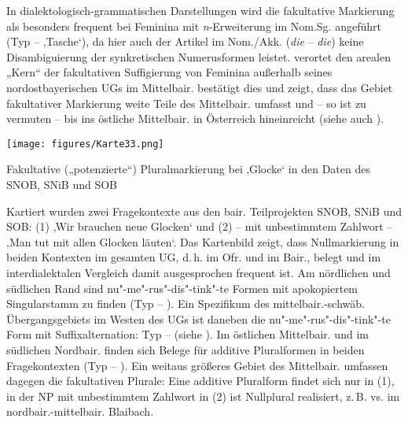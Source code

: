 In dialektologisch-grammatischen Darstellungen wird die fakultative Markierung als besonders frequent bei Feminina mit \textit{n}-Erweiterung im Nom.Sg. angeführt (Typ  --  ‚Tasche‘), da hier auch der Artikel im Nom./Akk. (\textit{die} -- \textit{die}) keine Dis\-am\-bi\-gu\-ie\-rung der synkretischen Numerusformen leistet. \citet[174]{Rowley1997} verortet den arealen „Kern“ der fakultativen Suffigierung von Feminina außerhalb seines nordostbayerischen UGs im Mittelbair.  bestätigt dies und zeigt, dass das Gebiet fakultativer Markierung weite Teile des Mittelbair. umfasst und -- so ist zu vermuten -- bis ins östliche Mittelbair. in Österreich hineinreicht (siehe auch \citealt{Mauser2007}).

\begin{map}
\texttt{[image: figures/Karte33.png]}
\caption{Fakultative („potenzierte“) Pluralmarkierung bei ‚Glocke‘ in den Daten des SNOB, SNiB und SOB}
\label{map:33}
\end{map}

Kartiert wurden zwei Fragekontexte aus den bair. Teilprojekten SNOB, SNiB und SOB: (1) ‚Wir brauchen neue Glocken‘ und (2) -- mit unbestimmtem Zahlwort -- ‚Man tut mit allen Glocken läuten‘. Das Kartenbild zeigt, dass Nullmarkierung in beiden Kontexten im gesamten UG, d.\,h. im Ofr. und im Bair., belegt und im interdialektalen Vergleich damit ausgesprochen frequent ist. Am nördlichen und südlichen Rand sind nu"-me"-rus"-dis"-tink"-te Formen mit apokopiertem Singularstamm zu finden (Typ  -- ). Ein Spezifikum des mittelbair.-schwäb. Übergangsgebiets im Westen des UGs ist daneben die nu"-me"-rus"-dis"-tink"-te Form mit Suffixalternation: Typ  --  (siehe ). Im östlichen Mittelbair. und im südlichen Nordbair. finden sich Belege für additive Pluralformen in beiden Fragekontexten (Typ  -- ). Ein weitaus größeres Gebiet des Mittelbair. umfassen dagegen die fakultativen Plurale: Eine additive Pluralform findet sich nur in (1), in der NP mit unbestimmtem Zahlwort in (2) ist Nullplural realisiert, z.\,B.   vs.     im nordbair.-mittelbair. Blaibach.

